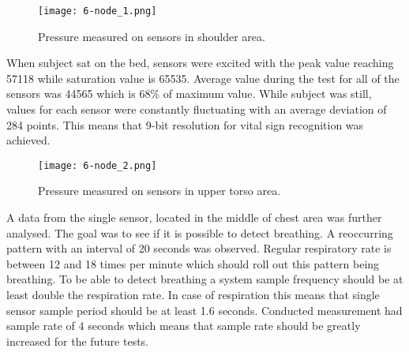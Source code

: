 \begin{figure}[h]
  \begin{center}
    \texttt{[image: 6-node\_1.png]}
  \end{center}
  \caption{Pressure measured on sensors in shoulder area.}
  \label{fig:node_1}
\end{figure}

When subject sat on the bed, sensors were excited with the peak value reaching 57118 while saturation value is 65535. Average value during the test for all of the sensors was 44565 which is 68\% of maximum value. While subject was still, values for each sensor were constantly fluctuating with an average deviation of 284 points. This means that 9-bit resolution for vital sign recognition was achieved. 

\begin{figure}[h]
  \begin{center}
    \texttt{[image: 6-node\_2.png]}
  \end{center}
  \caption{Pressure measured on sensors in upper torso area.}
  \label{fig:node_2}
\end{figure}

A data from the single sensor, located in the middle of chest area was further analysed. The goal was to see if it is possible to detect breathing. A reoccurring pattern with an interval of 20 seconds was observed. Regular respiratory rate is between 12 and 18 times per minute which should roll out this pattern being breathing. To be able to detect breathing a system sample frequency should be at least double the respiration rate. In case of respiration this means that single sensor sample period should be at least 1.6 seconds. Conducted measurement had sample rate of 4 seconds which means that sample rate should be greatly increased for the future tests.